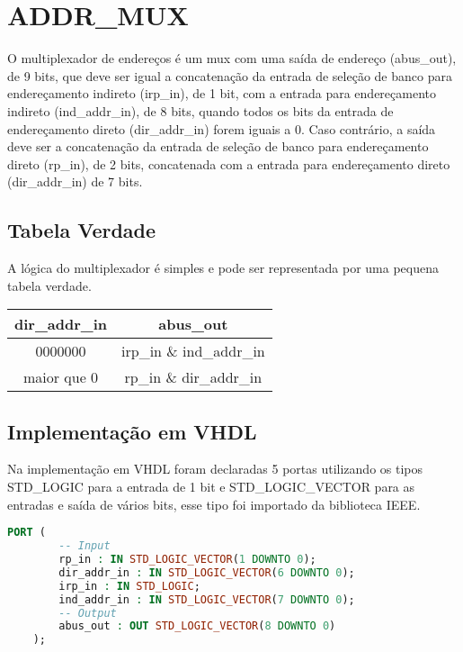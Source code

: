 \documentclass{article}
\begin{document}
\section{ADDR\_MUX}
O multiplexador de endereços é um mux com uma saída de endereço (abus\_out), de 9 bits, que deve ser igual a concatenação da entrada de seleção de banco para endereçamento indireto (irp\_in), de 1 bit, com a entrada para endereçamento indireto (ind\_addr\_in), de 8 bits, quando todos os bits da entrada de endereçamento direto (dir\_addr\_in) forem iguais a 0. Caso contrário, a saída deve ser a concatenação da entrada de seleção de banco para endereçamento direto (rp\_in), de 2 bits, concatenada com a entrada para endereçamento direto (dir\_addr\_in) de 7 bits.

\subsection {Tabela Verdade}

A lógica do multiplexador é simples e pode ser representada por uma pequena tabela verdade.

\begin{center}
    \begin{tabular}{|c|c|}
        \hline
        dir\_addr\_in & abus\_out \\
        \hline
              0000000 & irp\_in \& ind\_addr\_in \\
        \hline
          maior que 0 & rp\_in \& dir\_addr\_in \\
        \hline
    \end{tabular}
\end{center}

\subsection {Implementação em VHDL}

Na implementação em VHDL foram declaradas 5 portas utilizando os tipos STD\_LOGIC para a entrada de 1 bit e STD\_LOGIC\_VECTOR para as entradas e saída de vários bits, esse tipo foi importado da biblioteca IEEE.

\begin{lstlisting}[language=VHDL]
	PORT (
		-- Input
		rp_in : IN STD_LOGIC_VECTOR(1 DOWNTO 0);
		dir_addr_in : IN STD_LOGIC_VECTOR(6 DOWNTO 0);
		irp_in : IN STD_LOGIC;
		ind_addr_in : IN STD_LOGIC_VECTOR(7 DOWNTO 0);
		-- Output
		abus_out : OUT STD_LOGIC_VECTOR(8 DOWNTO 0)
	);
\end{lstlisting}
\end{document}

